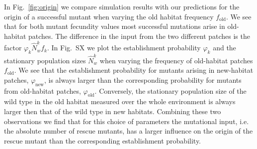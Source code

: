 \documentclass[a4paper,11pt]{article}
\newcommand{\chg}[1]{\textcolor{change}{#1}}
\begin{document}
In Fig.~\ref{fig:origin} we compare simulation results with our predictions for the origin of a successful mutant when varying the old habitat frequency $f_{\text{old}}$. \chg{We see that for both mutant fecundity values most successful mutations arise in old-habitat patches. The difference in the input from the two different patches is the factor $\varphi_{k} \widehat{N}_w^k f_k$. In Fig.~SX we plot the establishment probability $\varphi_k$ and the stationary population sizes $\widehat{N}_w^k$ when varying the frequency of old-habitat patches $f_{\text{old}}$. We see that the establishment probability for mutants arising in new-habitat patches, $\varphi_{\text{new}}$, is always larger than the corresponding probability for mutants from old-habitat patches, $\varphi_{\text{old}}$. Conversely, the stationary population size of the wild type in the old habitat measured over the whole environment is always larger then that of the wild type in new habitats. Combining these two observations we find that for this choice of parameters the mutational input, i.e. the absolute number of rescue mutants, has a larger influence on the origin of the rescue mutant than the corresponding establishment probability.}

\end{document}
